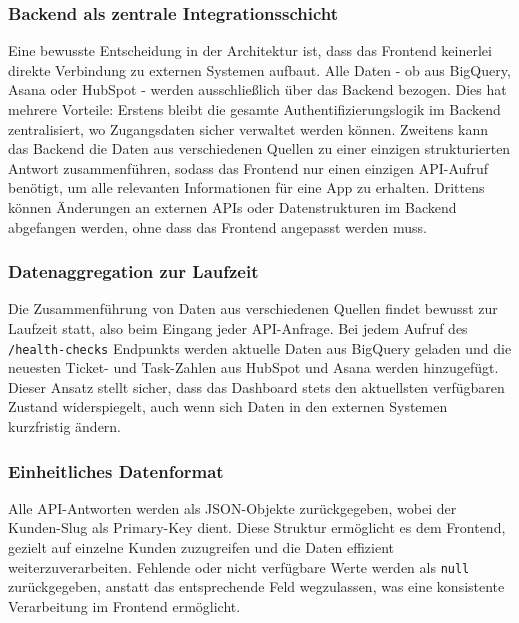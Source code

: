 \subsubsection{Backend als zentrale Integrationsschicht}
Eine bewusste Entscheidung in der Architektur ist, dass das Frontend keinerlei direkte Verbindung zu externen Systemen aufbaut. Alle Daten - ob aus BigQuery, Asana oder HubSpot - werden ausschließlich über das Backend bezogen. Dies hat mehrere Vorteile: Erstens bleibt die gesamte Authentifizierungslogik im Backend zentralisiert, wo Zugangsdaten sicher verwaltet werden können. Zweitens kann das Backend die Daten aus verschiedenen Quellen zu einer einzigen strukturierten Antwort zusammenführen, sodass das Frontend nur einen einzigen API-Aufruf benötigt, um alle relevanten Informationen für eine App zu erhalten. Drittens können Änderungen an externen APIs oder Datenstrukturen im Backend abgefangen werden, ohne dass das Frontend angepasst werden muss.

\subsubsection{Datenaggregation zur Laufzeit}
Die Zusammenführung von Daten aus verschiedenen Quellen findet bewusst zur Laufzeit statt, also beim Eingang jeder API-Anfrage. Bei jedem Aufruf des \texttt{/health-checks} Endpunkts werden aktuelle Daten aus BigQuery geladen und die neuesten Ticket- und Task-Zahlen aus HubSpot und Asana werden hinzugefügt. Dieser Ansatz stellt sicher, dass das Dashboard stets den aktuellsten verfügbaren Zustand widerspiegelt, auch wenn sich Daten in den externen Systemen kurzfristig ändern.

\subsubsection{Einheitliches Datenformat}
Alle API-Antworten werden als JSON-Objekte zurückgegeben, wobei der Kunden-Slug als Primary-Key dient. Diese Struktur ermöglicht es dem Frontend, gezielt auf einzelne Kunden zuzugreifen und die Daten effizient weiterzuverarbeiten. Fehlende oder nicht verfügbare Werte werden als \texttt{null} zurückgegeben, anstatt das entsprechende Feld wegzulassen, was eine konsistente Verarbeitung im Frontend ermöglicht.